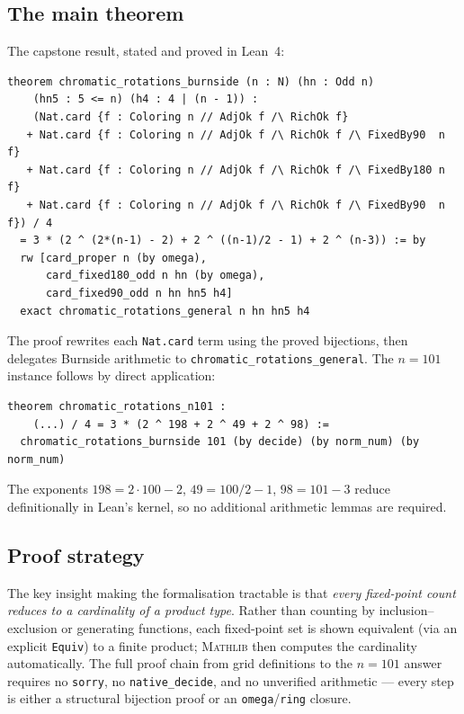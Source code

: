 \documentclass{article}
\begin{document}
\subsection{The main theorem}

The capstone result, stated and proved in Lean~4:

\begin{lstlisting}[language={},
  basicstyle=\scriptsize\ttfamily,
  backgroundcolor=\color{codebg},
  frame=single, numbers=none,
  caption={General Burnside theorem (\texttt{Answer.lean}).},
  label={lst:lean_main}]
theorem chromatic_rotations_burnside (n : N) (hn : Odd n)
    (hn5 : 5 <= n) (h4 : 4 | (n - 1)) :
    (Nat.card {f : Coloring n // AdjOk f /\ RichOk f}
   + Nat.card {f : Coloring n // AdjOk f /\ RichOk f /\ FixedBy90  n f}
   + Nat.card {f : Coloring n // AdjOk f /\ RichOk f /\ FixedBy180 n f}
   + Nat.card {f : Coloring n // AdjOk f /\ RichOk f /\ FixedBy90  n f}) / 4
  = 3 * (2 ^ (2*(n-1) - 2) + 2 ^ ((n-1)/2 - 1) + 2 ^ (n-3)) := by
  rw [card_proper n (by omega),
      card_fixed180_odd n hn (by omega),
      card_fixed90_odd n hn hn5 h4]
  exact chromatic_rotations_general n hn hn5 h4
\end{lstlisting}

\noindent
The proof rewrites each \texttt{Nat.card} term using the
proved bijections, then delegates Burnside arithmetic to
\texttt{chromatic\_rotations\_general}.
The $n=101$ instance follows by direct application:

\begin{lstlisting}[language={},
  basicstyle=\scriptsize\ttfamily,
  backgroundcolor=\color{codebg},
  frame=single, numbers=none,
  caption={The $n=101$ instance (\texttt{Answer.lean}).},
  label={lst:lean_101}]
theorem chromatic_rotations_n101 :
    (...) / 4 = 3 * (2 ^ 198 + 2 ^ 49 + 2 ^ 98) :=
  chromatic_rotations_burnside 101 (by decide) (by norm_num) (by norm_num)
\end{lstlisting}

\noindent
The exponents $198 = 2{\cdot}100-2$, $49 = 100/2-1$,
$98 = 101-3$ reduce definitionally in Lean's kernel,
so no additional arithmetic lemmas are required.

\subsection{Proof strategy}

The key insight making the formalisation tractable is that
\emph{every fixed-point count reduces to a cardinality of
a product type}.  Rather than counting by
inclusion--exclusion or generating functions, each
fixed-point set is shown equivalent (via an explicit
\texttt{Equiv}) to a finite product; \textsc{Mathlib} then
computes the cardinality automatically.
The full proof chain from grid definitions to the $n=101$
answer requires no \texttt{sorry}, no \texttt{native\_decide},
and no unverified arithmetic --- every step is either a
structural bijection proof or an \texttt{omega}/\texttt{ring}
closure.
\end{document}
